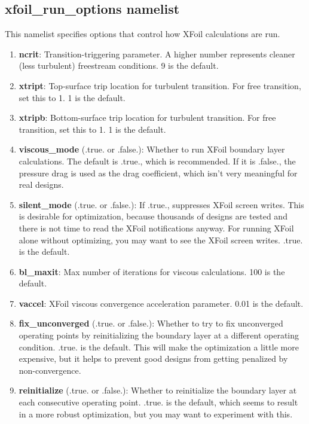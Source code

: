 \documentclass[11pt]{article}
\begin{document}
\subsection{xfoil\_run\_options namelist}

This namelist specifies options that control how XFoil calculations are run.

\begin{enumerate}
\item{\textbf{ncrit}: Transition-triggering parameter.  A higher number represents cleaner
(less turbulent) freestream conditions.  9 is the default.}
\item{\textbf{xtript}: Top-surface trip location for turbulent transition.  For free
transition, set this to 1.  1 is the default.}
\item{\textbf{xtripb}: Bottom-surface trip location for turbulent transition.  For free
transition, set this to 1.  1 is the default.}
\item{\textbf{viscous\_mode} (.true. or .false.): Whether to run XFoil boundary layer
calculations.  The default is .true., which is recommended.  If it is .false., the pressure
drag is used as the drag coefficient, which isn't very meaningful for real designs.}
\item{\textbf{silent\_mode} (.true. or .false.): If .true., suppresses XFoil screen writes.
This is desirable for optimization, because thousands of designs are tested and there is
not time to read the XFoil notifications anyway.  For running XFoil alone without
optimizing, you may want to see the XFoil screen writes.  .true. is the default.}
\item{\textbf{bl\_maxit}: Max number of iterations for viscous calculations.  100 is the
default.}
\item{\textbf{vaccel}: XFoil viscous convergence acceleration parameter.  0.01 is the
default.}
\item{\textbf{fix\_unconverged} (.true. or .false.): Whether to try to fix
unconverged operating points by reinitializing the boundary layer at a different operating
condition.  .true. is the default.  This will make the optimization a little more
expensive, but it helps to prevent good designs from getting penalized by
non-convergence.}
\item{\textbf{reinitialize} (.true. or .false.): Whether to reinitialize the boundary
layer at each consecutive operating point.  .true. is the default, which seems to result 
in a more robust optimization, but you may want to experiment with this.}
\end{enumerate}
\end{document}
